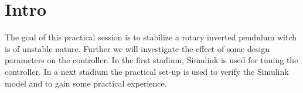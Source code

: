 \section{Intro}
The goal of this practical session is to stabilize a rotary inverted pendulum witch is of unstable nature. Further we will investigate the effect of some design parameters on the controller. In the first stadium, Simulink is used for tuning the controller. In a next stadium the practical set-up is used to verify the Simulink model and to gain some practical experience.

